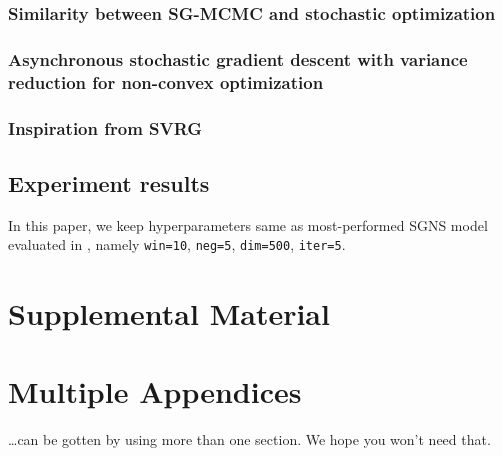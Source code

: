 \documentclass[11pt,a4paper]{article}
\begin{document}
\subsubsection{Similarity between SG-MCMC and stochastic optimization}
\subsubsection{Asynchronous stochastic gradient descent with variance reduction for non-convex optimization}
\subsubsection{Inspiration from SVRG}
\subsection{Experiment results}
In this paper, we keep hyperparameters same as most-performed SGNS model evaluated in \cite{levy2015improving}, namely \verb|win=10|, \verb|neg=5|, \verb|dim=500|, \verb|iter=5|. 



\appendix

\section{Supplemental Material}
\label{sec:supplemental}

\section{Multiple Appendices}
\dots can be gotten by using more than one section. We hope you won't
need that.
\end{document}

